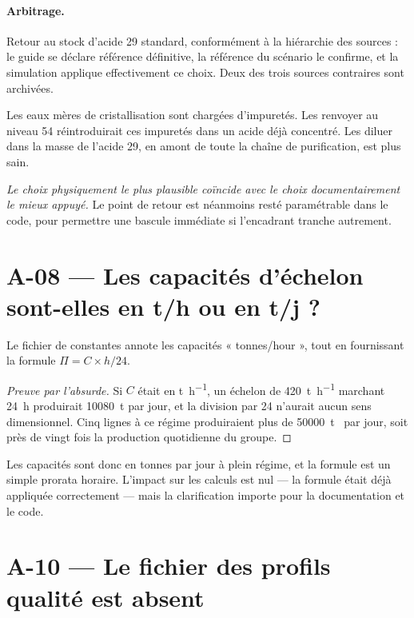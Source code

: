\paragraph{Arbitrage.} Retour au stock d'acide 29 standard, conformément à la hiérarchie des
sources : le guide se déclare référence définitive, la référence du scénario le confirme, et
la simulation applique effectivement ce choix. Deux des trois sources contraires sont
archivées.

\begin{encadre}[title={Un argument physique vient confirmer l'arbitrage documentaire}]
Les eaux mères de cristallisation sont chargées d'impuretés. Les renvoyer au niveau 54
réintroduirait ces impuretés dans un acide déjà concentré. Les diluer dans la masse de
l'acide 29, en amont de toute la chaîne de purification, est plus sain.

\emph{Le choix physiquement le plus plausible coïncide avec le choix documentairement le
mieux appuyé.} Le point de retour est néanmoins resté paramétrable dans le code, pour
permettre une bascule immédiate si l'encadrant tranche autrement.
\end{encadre}

\section{A-08 --- Les capacités d'échelon sont-elles en t/h ou en t/j ?}

Le fichier de constantes annote les capacités « tonnes/hour », tout en fournissant la
formule $\Pi = C \times h / 24$.

\begin{proof}[Preuve par l'absurde]
Si $C$ était en \si{\tonne\per\hour}, un échelon de \SI{420}{\tonne\per\hour} marchant
\SI{24}{\hour} produirait \SI{10080}{\tonne} par jour, et la division par 24 n'aurait aucun
sens dimensionnel. Cinq lignes à ce régime produiraient plus de
\SI{50000}{\tonne}~\PdeuxOcinq{} par jour, soit près de vingt fois la production quotidienne
du groupe.
\end{proof}

Les capacités sont donc en tonnes par jour à plein régime, et la formule est un simple
prorata horaire. L'impact sur les calculs est nul --- la formule était déjà appliquée
correctement --- mais la clarification importe pour la documentation et le code.

\section{A-10 --- Le fichier des profils qualité est absent}

